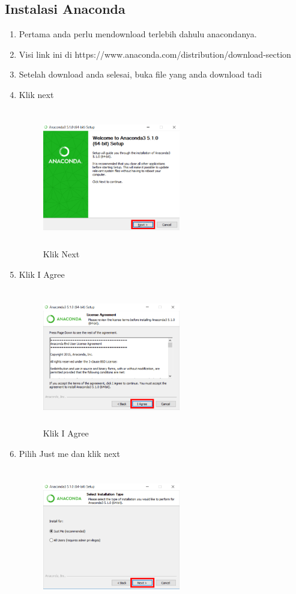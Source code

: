 \subsection{Instalasi Anaconda}
\begin{enumerate}
\item Pertama anda perlu mendownload terlebih dahulu anacondanya.
\item Visi link ini di https://www.anaconda.com/distribution/download-section
\item Setelah download anda selesai, buka file yang anda download tadi
\item Klik next
\begin{figure}[H]
\centering
\includegraphics[width=6cm,height=6cm]{figures/1chan.png}
\caption{Klik Next}
\label{akhir}
\end{figure}
\item Klik I Agree
\begin{figure}[H]
\centering
\includegraphics[width=6cm,height=6cm]{figures/2chan.png}
\caption{Klik I Agree}
\label{akhir}
\end{figure}
\item Pilih Just me dan klik next
\begin{figure}[H]
\centering
\includegraphics[width=6cm,height=6cm]{figures/3chan.png}

\end{figure}
\end{enumerate}
